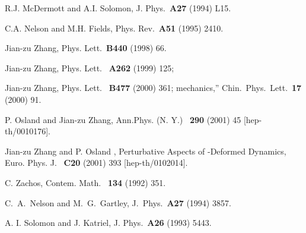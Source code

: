 \documentclass[a4paper,12pt]{article}
\begin{document}
\begin{thebibliography}{99}
R.J. McDermott and A.I. Solomon, J. Phys.\ {\bf A27} (1994) L15.

C.A. Nelson and M.H. Fields, Phys. Rev.\ {\bf A51} (1995) 2410.

Jian-zu Zhang, Phys. Lett.\ {\bf B440} (1998) 66.

Jian-zu Zhang, Phys. Lett. \ {\bf A262} (1999) 125;

Jian-zu Zhang, Phys. Lett. \ {\bf B477} (2000) 361;
mechanics,''
Chin.\ Phys.\ Lett.\ {\bf 17} (2000) 91.

P. Osland and Jian-zu Zhang, 
Ann.Phys. (N. Y.) \ {\bf 290} (2001) 45
[hep-th/0010176].

Jian-zu Zhang and P. Osland ,  Perturbative Aspects of \coordHE{}-Deformed Dynamics,
  Euro. Phys. J.  \ {\bf C20} (2001) 393
[hep-th/0102014].

C. Zachos, Contem. Math. \ {\bf 134} (1992) 351.

C.~A.~Nelson and M.~G.~Gartley,
J.\ Phys.\ {\bf A27} (1994) 3857.

A. I. Solomon and J. Katriel, J. Phys.\ {\bf  A26} (1993) 5443.
\end{thebibliography}
\end{document}
